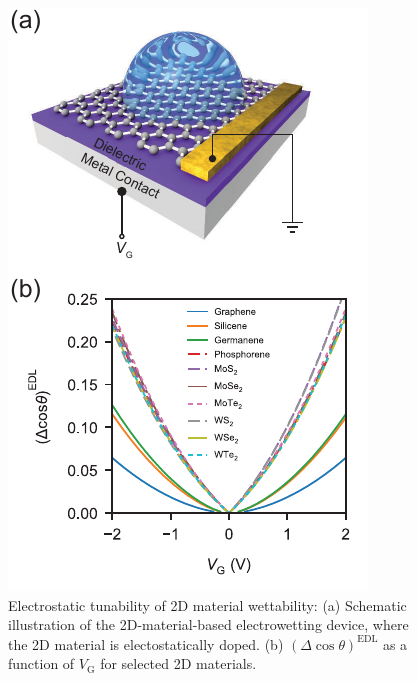 \documentclass[journal=langd5,manuscript=article,email=true,hyperref=true,keywords=true]{achemso}
\begin{document}
\begin{figure}[htbp]
\centering
\includegraphics[width=0.65\linewidth]{../img/dcos-all-2D.pdf}
\caption{\label{fig:dcos-all-2D} Electrostatic tunability of 2D
  material wettability: (a) Schematic illustration of the
  2D-material-based electrowetting device, where the 2D material is
  electostatically doped. (b) \((\Delta\cos\theta)^{\mathrm{EDL}}\) as
  a function of \(V_{\mathrm{G}}\) for selected 2D materials.}
\end{figure}
\end{document}
